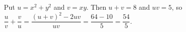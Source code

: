 Put $u=x^2+y^2$ and $v=xy$. Then $u+v=8$ and $uv=5$, so $\dfrac{u}{v}+\dfrac{v}{u}=\dfrac{(u+v)^2-2uv}{uv}=\dfrac{64-10}{5}=\boxed{\dfrac{54}{5}}$.
